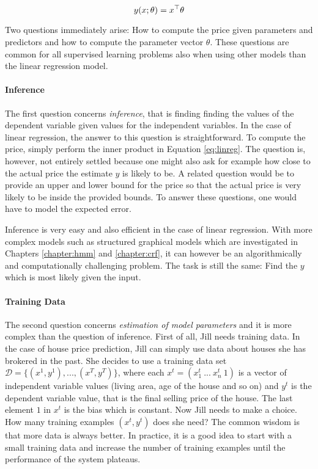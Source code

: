 \begin{equation}
y(x\mbox{$ ; \, $} \theta) = x^\top\theta\label{eq:linreg}
\end{equation}

Two questions immediately arise: How to compute the price given
parameters and predictors and how to compute the parameter vector
$\theta$. These questions are common for all supervised learning
problems also when using other models than the linear regression
model.

\paragraph{Inference} The first question concerns {\it inference},
that is finding finding the values of the dependent variable given
values for the independent variables. In the case of linear
regression, the answer to this question is straightforward. To compute
the price, simply perform the inner product in Equation
\ref{eq:linreg}. The question is, however, not entirely settled
because one might also ask for example how close to the actual price
the estimate $y$ is likely to be. A related question would be to
provide an upper and lower bound for the price so that the actual
price is very likely to be inside the provided bounds. To answer these
questions, one would have to model the expected error.

Inference is very easy and also efficient in the case of linear
regression. With more complex models such as structured graphical
models which are investigated in Chapters \ref{chapter:hmm} and
\ref{chapter:crf}, it can however be an algorithmically and
computationally challenging problem. The task is still the
same: Find the $y$ which is most likely given the input.

\paragraph{Training Data} The second question concerns {\it estimation
  of model parameters} and it is more complex than the question of
inference. First of all, Jill needs training data.  In the case of
house price prediction, Jill can simply use data about houses she has
brokered in the past. She decides to use a training data set
$\mathcal{D} = \{(x^1, y^1), ..., (x^T, y^T)\}$, where each $x^t =
(x^t_1\ ...\ x^t_n\ 1)$ is a vector of independent variable values
(living area, age of the house and so on) and $y^t$ is the dependent
variable value, that is the final selling price of the house. The last
element $1$ in $x^t$ is the bias which is constant. Now Jill needs to
make a choice. How many training examples $(x^t, y^t)$ does she need?
The common wisdom is that more data is always better. In practice, it
is a good idea to start with a small training data and increase the
number of training examples until the performance of the system
plateaus.

